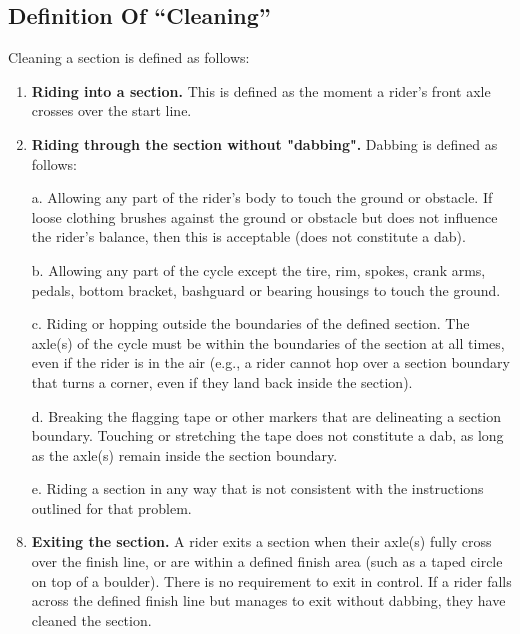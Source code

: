 \subsection{Definition Of “Cleaning”}
Cleaning a section is defined as follows:\\
\begin{enumerate}


\item \textbf{Riding into a section.} This is defined as the moment a rider's front axle crosses over the start line.\\
\item \textbf{Riding through the section without "dabbing".} Dabbing is defined as follows:\\
\item[a.] Allowing any part of the rider's body to touch the ground or obstacle. If loose clothing brushes against the ground or obstacle but does not influence the rider's balance, then this is acceptable (does not constitute a dab).\\
\item[b.] Allowing any part of the cycle except the tire, rim, spokes, crank arms, pedals, bottom bracket, bashguard or bearing housings to touch the ground.\\
\item[c.] Riding or hopping outside the boundaries of the defined section. The axle(s) of the cycle must be within the boundaries of the section at all times, even if the rider is in the air (e.g., a rider cannot hop over a section boundary that turns a corner, even if they land back inside the section).\\
\item[d.] Breaking the flagging tape or other markers that are delineating a section boundary. Touching or stretching the tape does not constitute a dab, as long as the axle(s) remain inside the section boundary.\\
\item[e.] Riding a section in any way that is not consistent with the instructions outlined for that problem.\\
\item \textbf{Exiting the section.} A rider exits a section when their axle(s) fully cross over the finish line, or are within a
defined finish area (such as a taped circle on top of a boulder). There is no requirement to exit in control. If a rider
falls across the defined finish line but manages to exit without dabbing, they have cleaned the section.
\end{enumerate}
